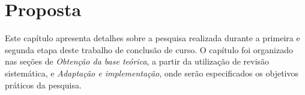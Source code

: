 \chapter[Proposta]{Proposta}

Este capítulo apresenta detalhes sobre a pesquisa realizada durante a primeira e segunda etapa deste trabalho de conclusão de curso. O capítulo foi organizado nas seções de \textit{Obtenção da base teórica}, a partir da utilização de revisão sistemática, e \textit{Adaptação e implementação}, onde serão especificados os objetivos práticos da pesquisa.